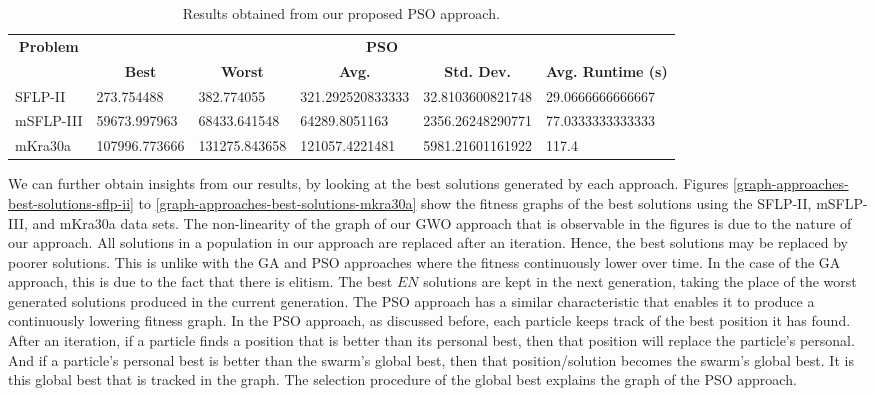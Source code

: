 \begin{table}[h!]
\begin{adjustwidth}{-1.18in}{}
\centering
\begin{tabular}{|l|l|l|l|l|l|}
	\hline
	\multicolumn{1}{|c|}{\multirow{2}{*}{\textbf{Problem}}} & \multicolumn{5}{c|}{\textbf{PSO}} \\ \cline{2-6} 
	\multicolumn{1}{|c|}{}                                  & \multicolumn{1}{c|}{\textbf{Best}} & \multicolumn{1}{c|}{\textbf{Worst}} & \multicolumn{1}{c|}{\textbf{Avg.}} & \multicolumn{1}{c|}{\textbf{Std. Dev.}} & \multicolumn{1}{c|}{\textbf{Avg. Runtime (s)}} \\ \hline
	SFLP-II                                                 & 273.754488                                  & 382.774055                                   &
	321.292520833333							&
	32.8103600821748							&
	29.0666666666667							\\ \hline
	mSFLP-III                                               & 59673.997963                                & 68433.641548                                 &
	64289.8051163					          &
	2356.26248290771						&
	77.0333333333333						\\ \hline
	mKra30a                                               & 107996.773666                                & 131275.843658                                 &
	121057.4221481							&
	5981.21601161922							&
	117.4						\\ \hline
\end{tabular}
\end{adjustwidth}
\caption{Results obtained from our proposed PSO approach.}
\label{approach-pso-results}
\end{table}

We can further obtain insights from our results, by looking at the best solutions generated by each approach. Figures \ref{graph-approaches-best-solutions-sflp-ii} to \ref{graph-approaches-best-solutions-mkra30a} show the fitness graphs of the best solutions using the SFLP-II, mSFLP-III, and mKra30a data sets. The non-linearity of the graph of our GWO approach that is observable in the figures is due to the nature of our approach. All solutions in a population in our approach are replaced after an iteration. Hence, the best solutions may be replaced by poorer solutions. This is unlike with the GA and PSO approaches where  the fitness continuously lower over time. In the case of the GA approach, this is due to the fact that there is elitism. The best $EN$ solutions are kept in the next generation, taking the place of the worst generated solutions produced in the current generation. The PSO approach has a similar characteristic that enables it to produce a continuously lowering fitness graph. In the PSO approach, as discussed before, each particle keeps track of the best position it has found. After an iteration, if a particle finds a position that is better than its personal best, then that position will replace the particle's personal. And if a particle's personal best is better than the swarm's global best, then that position/solution becomes the swarm's global best. It is this global best that is tracked in the graph. The selection procedure of the global best explains the graph of the PSO approach.

